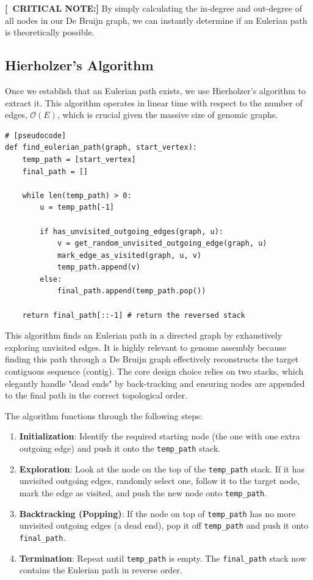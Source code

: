 \documentclass[11pt,a4paper]{article}
\newcommand{\sta}{\textbf{[\textasteriskcentered\ CRITICAL NOTE:] }}
\begin{document}
\sta By simply calculating the in-degree and out-degree of all nodes in our De Bruijn graph, we can instantly determine if an Eulerian path is theoretically possible. 

\subsection{Hierholzer's Algorithm}

Once we establish that an Eulerian path exists, we use Hierholzer's algorithm to extract it. This algorithm operates in linear time with respect to the number of edges, $\mathcal{O}(E)$, which is crucial given the massive size of genomic graphs.

\begin{verbatim}
# [pseudocode]
def find_eulerian_path(graph, start_vertex):
    temp_path = [start_vertex]
    final_path = []

    while len(temp_path) > 0:
        u = temp_path[-1]
        
        if has_unvisited_outgoing_edges(graph, u):
            v = get_random_unvisited_outgoing_edge(graph, u)
            mark_edge_as_visited(graph, u, v)
            temp_path.append(v)
        else:
            final_path.append(temp_path.pop())

    return final_path[::-1] # return the reversed stack
\end{verbatim}

This algorithm finds an Eulerian path in a directed graph by exhaustively exploring unvisited edges. It is highly relevant to genome assembly because finding this path through a De Bruijn graph effectively reconstructs the target contiguous sequence (contig). The core design choice relies on two stacks, which elegantly handle "dead ends" by back-tracking and ensuring nodes are appended to the final path in the correct topological order.

The algorithm functions through the following steps:
\begin{enumerate}
    \item \textbf{Initialization}: Identify the required starting node (the one with one extra outgoing edge) and push it onto the \texttt{temp\_path} stack.
    \item \textbf{Exploration}: Look at the node on the top of the \texttt{temp\_path} stack. If it has unvisited outgoing edges, randomly select one, follow it to the target node, mark the edge as visited, and push the new node onto \texttt{temp\_path}.
    \item \textbf{Backtracking (Popping)}: If the node on top of \texttt{temp\_path} has no more unvisited outgoing edges (a dead end), pop it off \texttt{temp\_path} and push it onto \texttt{final\_path}.
    \item \textbf{Termination}: Repeat until \texttt{temp\_path} is empty. The \texttt{final\_path} stack now contains the Eulerian path in reverse order.
\end{enumerate}
\end{document}
